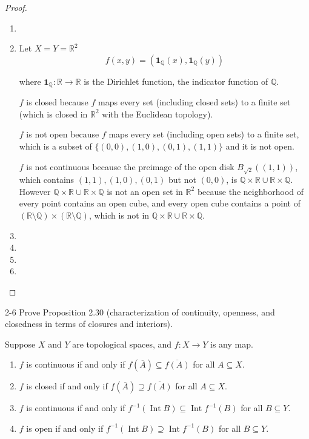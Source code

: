 \begin{proof}
	\begin{enumerate}[label={(\alph*)}]
		\item
		\item Let $X = Y = \mathbb{R}^{2}$
		      \[
			      f(x, y) = (\mathbf{1}_{\mathbb{Q}}(x), \mathbf{1}_{\mathbb{Q}}(y))
		      \]

		      where $\mathbf{1}_{\mathbb{Q}}: \mathbb{R} \to \mathbb{R}$ is the Dirichlet function, the indicator function of $\mathbb{Q}$.

		      $f$ is closed because $f$ maps every set (including closed sets) to a finite set (which is closed in $\mathbb{R}^{2}$ with the Euclidean topology).

		      $f$ is not open because $f$ maps every set (including open sets) to a finite set, which is a subset of $\{ (0, 0), (1, 0), (0, 1), (1, 1) \}$ and it is not open.

		      $f$ is not continuous because the preimage of the open disk $B_{\sqrt{2}}((1, 1))$, which contains $(1, 1), (1, 0), (0, 1)$ but not $(0, 0)$, is $\mathbb{Q}\times\mathbb{R} \cup \mathbb{R}\times\mathbb{Q}$. However $\mathbb{Q}\times\mathbb{R} \cup \mathbb{R}\times\mathbb{Q}$ is not an open set in $\mathbb{R}^{2}$ because the neighborhood of every point contains an open cube, and every open cube contains a point of $(\mathbb{R}\setminus\mathbb{Q})\times (\mathbb{R}\setminus\mathbb{Q})$, which is not in $\mathbb{Q}\times\mathbb{R} \cup \mathbb{R}\times\mathbb{Q}$.
		\item
		\item
		\item
		\item
	\end{enumerate}
\end{proof}

\begin{problem}{2-6}
Prove Proposition 2.30 (characterization of continuity, openness, and closedness in terms of closures and interiors).

Suppose $X$ and $Y$ are topological spaces, and $f: X\to Y$ is any map.
\begin{enumerate}[label={(\alph*)}]
	\item $f$ is continuous if and only if $f(\overline{A}) \subseteq \overline{f(A)}$ for all $A\subseteq X$.
	\item $f$ is closed if and only if $f(\overline{A})\supseteq \overline{f(A)}$ for all $A\subseteq X$.
	\item $f$ is continuous if and only if $f^{-1}(\operatorname{Int}B) \subseteq \operatorname{Int} f^{-1}(B)$ for all $B\subseteq Y$.
	\item $f$ is open if and only if $f^{-1}(\operatorname{Int} B) \supseteq \operatorname{Int} f^{-1}(B)$ for all $B\subseteq Y$.
\end{enumerate}
\end{problem}

